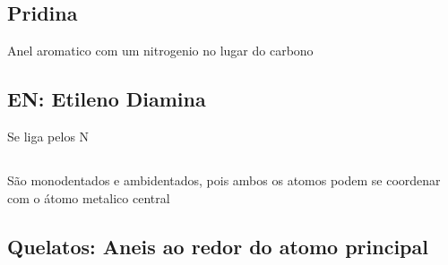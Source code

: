 \documentclass[12pt]{article}
\begin{document}
\subsection{Pridina }
Anel aromatico com um nitrogenio no lugar do carbono

\subsection{EN: Etileno Diamina } 
Se liga pelos N

\subsection{}
São monodentados e ambidentados, pois ambos os atomos podem se coordenar com o átomo metalico central

\subsection{Quelatos: Aneis ao redor do atomo principal}
\end{document}
